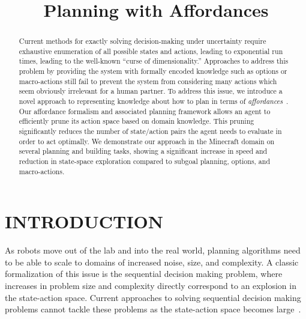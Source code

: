 \documentclass[]{article}
\title{Planning with Affordances}
\begin{document}
\author{}
\maketitle

\begin{abstract}
Current methods for exactly solving decision-making under uncertainty
require exhaustive enumeration of all possible states and actions,
leading to exponential run times, leading to the well-known ``curse of
dimensionality.''  Approaches to address this problem by providing the
system with formally encoded knowledge such as options or
macro-actions still fail to prevent the system from considering many
actions which seem obviously irrelevant for a human partner.  To
address this issue, we introduce a novel approach to representing
knowledge about how to plan in terms of {\em
  affordances}~\citep{gibson77}.  Our affordance formalism and
associated planning framework allows an agent to efficiently prune its
action space based on domain knowledge.  This pruning significantly
reduces the number of state/action pairs the agent needs to evaluate
in order to act optimally.  We demonstrate our approach in the
Minecraft domain on several planning and building tasks, showing a
significant increase in speed and reduction in state-space exploration
compared to subgoal planning, options, and macro-actions.
\end{abstract}

\section{INTRODUCTION}

As robots move out of the lab and into the real world, planning
algorithms need to be able to scale to domains of increased noise,
size, and complexity.  A classic formalization of this issue is the
sequential decision making problem, where increases in problem size
and complexity directly correspond to an explosion in the state-action
space. Current approaches to solving sequential decision making
problems cannot tackle these problems as the state-action space
becomes large~\citep{grounds05a}.
\end{document}
